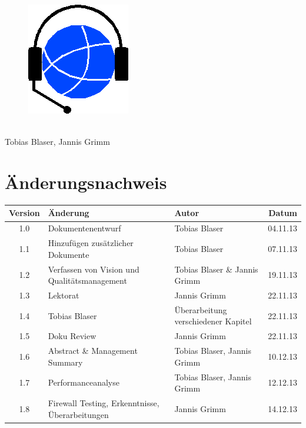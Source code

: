 
\usepackage{csvsimple}

\providecommand{\documentType}{Projektdokumentation}
\providecommand{\versionnumber}{1.8}



\thispagestyle{empty}
\begin{titlepage}
	\begin{center}

	\vspace*{40mm}
	
	\begin{figure}[htp]
		\centering
		\includegraphics[scale=0.60]{../img/icon-js-voip.png}
	\end{figure}		
	\vspace*{20mm}
	
	{\fontsize{40}{48} \selectfont \project \\[10mm]}
	\vspace*{20mm}
	Tobias Blaser, Jannis Grimm

\end{center}
\end{titlepage}
\clearpage

\chapter*{Änderungsnachweis}
\begin{tabularx}{\textwidth}{|cXlr|} %
		\hline
		\textbf{Version} & \textbf{Änderung} & \textbf{Autor} & \textbf{Datum}\\
		\hline
		1.0 & Dokumentenentwurf & Tobias Blaser & 04.11.13\\
		1.1 & Hinzufügen zusätzlicher Dokumente & Tobias Blaser & 07.11.13\\
		1.2 & Verfassen von Vision und Qualitätsmanagement & Tobias Blaser \& Jannis Grimm & 19.11.13\\
		1.3 & Lektorat & Jannis Grimm & 22.11.13\\
		1.4 & Tobias Blaser & Überarbeitung verschiedener Kapitel & 22.11.13\\
		1.5 & Doku Review & Jannis Grimm & 22.11.13\\
		1.6 & Abstract \& Management Summary & Tobias Blaser, Jannis Grimm & 10.12.13\\
		1.7 & Performanceanalyse & Tobias Blaser, Jannis Grimm & 12.12.13\\
		\versionnumber & Firewall Testing, Erkenntnisse, Überarbeitungen & Jannis
		Grimm & 14.12.13\\
		\hline
\end{tabularx}

